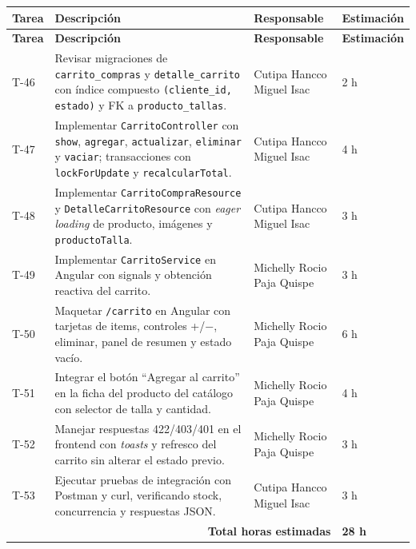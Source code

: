 \documentclass[12pt,a4paper]{article}
\begin{document}
{\small
\begin{longtable}{p{1.2cm} p{7.9cm} p{4.2cm} p{1.7cm}}
\toprule
\textbf{Tarea} & \textbf{Descripción} & \textbf{Responsable} & \textbf{Estimación} \\
\midrule
\endfirsthead

\toprule
\textbf{Tarea} & \textbf{Descripción} & \textbf{Responsable} & \textbf{Estimación} \\
\midrule
\endhead

\bottomrule
\endlastfoot

T-46 & Revisar migraciones de \texttt{carrito\_compras} y \texttt{detalle\_carrito} con índice compuesto \texttt{(cliente\_id, estado)} y FK a \texttt{producto\_tallas}. & Cutipa Hancco Miguel Isac & 2 h \\
T-47 & Implementar \texttt{CarritoController} con \texttt{show}, \texttt{agregar}, \texttt{actualizar}, \texttt{eliminar} y \texttt{vaciar}; transacciones con \texttt{lockForUpdate} y \texttt{recalcularTotal}. & Cutipa Hancco Miguel Isac & 4 h \\
T-48 & Implementar \texttt{CarritoCompraResource} y \texttt{DetalleCarritoResource} con \textit{eager loading} de producto, imágenes y \texttt{productoTalla}. & Cutipa Hancco Miguel Isac & 3 h \\
T-49 & Implementar \texttt{CarritoService} en Angular con signals y obtención reactiva del carrito. & Michelly Rocio Paja Quispe & 3 h \\
T-50 & Maquetar \texttt{/carrito} en Angular con tarjetas de items, controles +/−, eliminar, panel de resumen y estado vacío. & Michelly Rocio Paja Quispe & 6 h \\
T-51 & Integrar el botón ``Agregar al carrito'' en la ficha del producto del catálogo con selector de talla y cantidad. & Michelly Rocio Paja Quispe & 4 h \\
T-52 & Manejar respuestas 422/403/401 en el frontend con \textit{toasts} y refresco del carrito sin alterar el estado previo. & Michelly Rocio Paja Quispe & 3 h \\
T-53 & Ejecutar pruebas de integración con Postman y curl, verificando stock, concurrencia y respuestas JSON. & Cutipa Hancco Miguel Isac & 3 h \\

\midrule
\multicolumn{3}{r}{\textbf{Total horas estimadas}} & \textbf{28 h} \\

\end{longtable}
}
\end{document}
